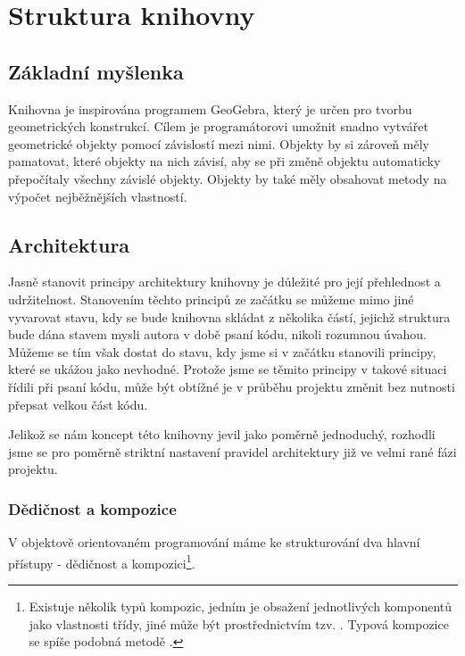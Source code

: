 \chapter{Struktura knihovny}
\label{chap:strucutre}

\section{Základní myšlenka}
\label{sec:basic-idea}

Knihovna je inspirována programem GeoGebra, který je určen pro tvorbu geometrických konstrukcí. 
Cílem je programátorovi umožnit snadno vytvářet geometrické objekty pomocí závislostí mezi nimi.
Objekty by si zároveň měly pamatovat, které objekty na nich závisí, aby se při změně objektu automaticky přepočítaly všechny závislé objekty.
Objekty by také měly obsahovat metody na výpočet nejběžnějších vlastností.

\section{Architektura}
\label{sec:architecture}

Jasně stanovit principy architektury knihovny je důležité pro její přehlednost a udržitelnost.
Stanovením těchto principů ze začátku se můžeme mimo jiné vyvarovat stavu, kdy se bude knihovna skládat z několika částí, jejichž struktura bude dána stavem mysli autora v době psaní kódu, nikoli rozumnou úvahou.
Můžeme se tím však dostat do stavu, kdy jsme si v začátku stanovili principy, které se ukážou jako nevhodné. 
Protože jsme se těmito principy v takové situaci řídili při psaní kódu, může být obtížné je v průběhu projektu změnit bez nutnosti přepsat velkou část kódu.

Jelikož se nám koncept této knihovny jevil jako poměrně jednoduchý, rozhodli jsme se pro poměrně striktní nastavení pravidel architektury již ve velmi rané fázi projektu\cite{geometryjs:wiki:code-structure}.

\subsection{Dědičnost a kompozice}
\label{subsec:inheritance-composition}

V objektově orientovaném programování máme ke strukturování dva hlavní přístupy - dědičnost\cite{wikipedia:inheritance} a kompozici\footnote{Existuje několik typů kompozic, jedním je obsažení jednotlivých komponentů jako vlastnosti třídy, jiné může být prostřednictvím tzv. \cite{Rust:traits}. Typová kompozice se spíše podobná metodě . }.

